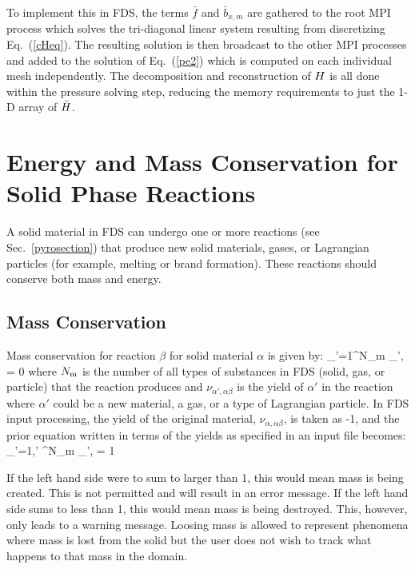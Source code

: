 To implement this in FDS, the terms $\bar{f}$ and $\bar{b}_{x,m}$ are gathered to the root MPI process which solves the tri-diagonal linear system resulting from discretizing Eq.~(\ref{cHeq}). The resulting solution is then broadcast to the other MPI processes and added to the solution of Eq.~(\ref{pe2}) which is computed on each individual mesh independently. The decomposition and reconstruction of $H$ is all done within the pressure solving step, reducing the memory requirements to just the 1-D array of $\bar{H}$.

\chapter{Energy and Mass Conservation for Solid Phase Reactions}
\label{solid_energy_mass}

A solid material in FDS can undergo one or more reactions (see Sec.~\ref{pyrosection}) that produce new solid materials, gases, or Lagrangian particles (for example, melting or brand formation). These reactions should conserve both mass and energy.

\section{Mass Conservation}

Mass conservation for reaction $\beta$ for solid material $\alpha$ is given by:
\be
   \sum_{\alpha'=1}^{N_{\rm m}} \nu_{\alpha',\alpha \beta} = 0
\ee
where $N_{\rm m}$ is the number of all types of substances in FDS (solid, gas, or particle) that the reaction produces and $\nu_{\alpha',\alpha \beta}$ is the yield of $\alpha'$ in the reaction where $\alpha'$ could be a new material, a gas, or a type of Lagrangian particle. In FDS input processing, the yield of the original material, $\nu_{\alpha,\alpha \beta}$, is taken as -1, and the prior equation written in terms of the yields as specified in an input file becomes:
\be
\sum_{\alpha'=1,\alpha' \neq \alpha}^{N_{\rm m}} \nu_{\alpha',\alpha \beta} = 1
\label {eq:solid_nusum} \ee

If the left hand side were to sum to larger than 1, this would mean mass is being created. This is not permitted and will result in an error message. If the left hand side sums to less than 1, this would mean mass is being destroyed. This, however, only leads to a warning message. Loosing mass is allowed to represent phenomena where mass is lost from the solid but the user does not wish to track what happens to that mass in the domain.

